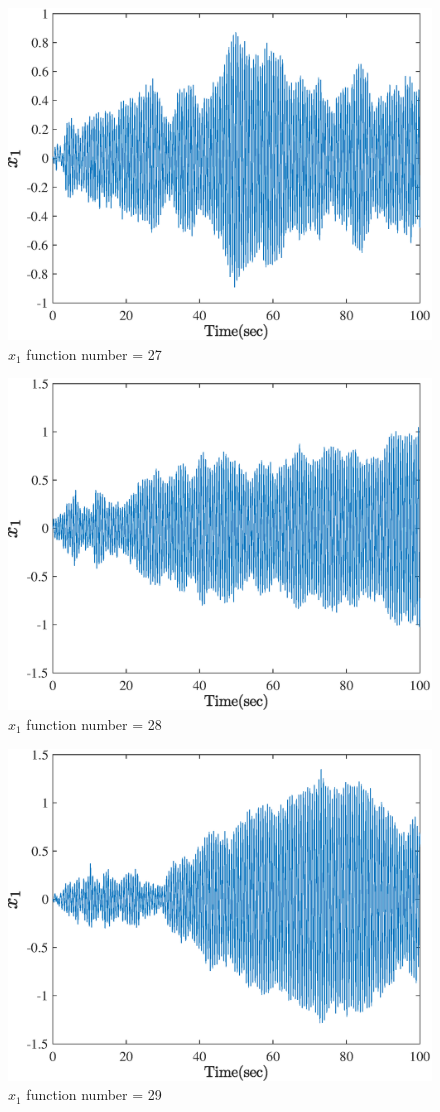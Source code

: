   \begin{figure}[H] 
  	\caption{$x_1$ function number = 27} 
  	\centering 
  	\includegraphics[width=12cm]{../Figure/Q5/part_a/27} 
  \end{figure}
  \begin{figure}[H] 
  	\caption{$x_1$ function number = 28} 
  	\centering 
  	\includegraphics[width=12cm]{../Figure/Q5/part_a/28} 
  \end{figure}
  \begin{figure}[H] 
  	\caption{$x_1$ function number = 29} 
  	\centering 
  	\includegraphics[width=12cm]{../Figure/Q5/part_a/29} 
  \end{figure}
